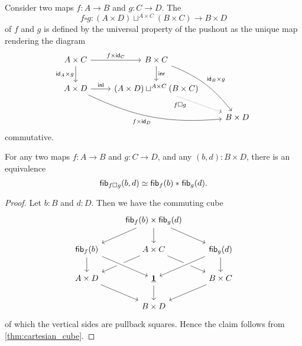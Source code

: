 \begin{defn}
Consider two maps $f:A\to B$ and $g:C\to D$.
The 
\begin{equation*}
f\square g : (A\times D)\sqcup^{A\times C} (B\times C)\to B\times D
\end{equation*}
of $f$ and $g$ is defined by the universal property of the pushout as the unique map rendering the diagram
\begin{equation*}
\begin{tikzcd}
A\times C \arrow[r,"{f\times \idfunc[C]}"] \arrow[d,swap,"{\idfunc[A]\times g}"] & B\times C \arrow[d,"\inr"] \arrow[ddr,bend left=15,"{\idfunc[B]\times g}"] \\
A\times D \arrow[r,"\inl"] \arrow[drr,bend right=15,swap,"{f\times\idfunc[D]}"] & (A\times D)\sqcup^{A\times C} (B\times C) \arrow[dr,densely dotted,swap,near start,"f\square g"] \\
& & B\times D
\end{tikzcd}
\end{equation*}
commutative.
\end{defn}

\begin{prp}
For any two maps $f:A\to B$ and $g:C\to D$, and any $(b,d):B\times D$, there is an equivalence
\begin{equation*}
\eqv{\fib{f\square g}{b,d}}{\join{\fib{f}{b}}{\fib{g}{d}}}.
\end{equation*}
\end{prp}

\begin{proof}
Let $b:B$ and $d:D$. Then we have the commuting cube 
\begin{equation*}
\begin{tikzcd}
& \fib{f}{b}\times \fib{g}{d} \arrow[dl] \arrow[d] \arrow[dr] \\
\fib{f}{b} \arrow[d] & A\times C \arrow[dl] \arrow[dr] & \fib{g}{d} \arrow[dl,crossing over] \arrow[d] \\
A\times D \arrow[dr] & \unit \arrow[from=ul,crossing over] \arrow[d] & B\times C \arrow[dl] \\
& B\times D
\end{tikzcd}
\end{equation*}
of which the vertical sides are pullback squares. Hence the claim follows from \cref{thm:cartesian_cube}.
\end{proof}

